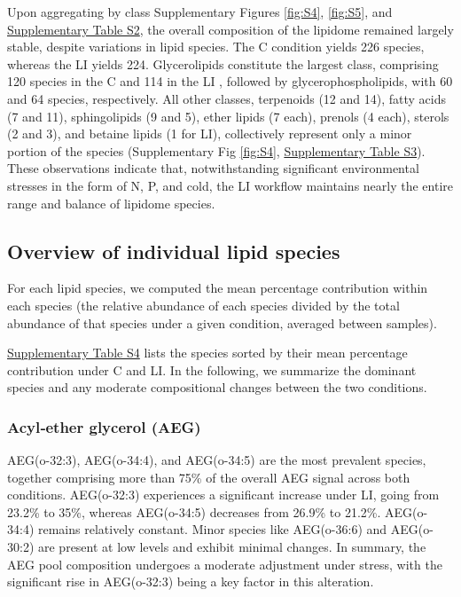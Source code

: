\documentclass[10pt,letterpaper]{article}
\begin{document}
Upon aggregating by class Supplementary Figures \ref{fig:S4}, \ref{fig:S5}, and \href{https://docs.google.com/spreadsheets/d/1SB90-QLYheKEzmHCUIh1UfgkrtbL064s8Oo5BfwFaV0/edit?gid=675277745#gid=675277745}{Supplementary Table S2}, the overall composition of the lipidome remained largely stable, despite variations in lipid species. The C condition yields 226 species, whereas the LI  yields 224. Glycerolipids constitute the largest class, comprising 120 species in the C and 114 in the LI , followed by glycerophospholipids, with 60 and 64 species, respectively. All other classes, terpenoids (12 and 14), fatty acids (7 and 11), sphingolipids (9 and 5), ether lipids (7 each), prenols (4 each), sterols (2 and 3), and betaine lipids (1 for LI), collectively represent only a minor portion of the species (Supplementary Fig \ref{fig:S4}, \href{https://docs.google.com/spreadsheets/d/1SB90-QLYheKEzmHCUIh1UfgkrtbL064s8Oo5BfwFaV0/edit?gid=675277745#gid=675277745}{Supplementary Table S3}). These observations indicate that, notwithstanding significant environmental stresses in the form of N, P, and cold, the LI workflow maintains nearly the entire range and balance of lipidome species.

\subsection*{Overview of individual lipid species}
For each lipid species, we computed the mean percentage contribution within each species (the relative abundance of each species divided by the total abundance of that species under a given condition, averaged between samples). 

\href{https://docs.google.com/spreadsheets/d/1SB90-QLYheKEzmHCUIh1UfgkrtbL064s8Oo5BfwFaV0/edit?gid=675277745#gid=675277745}{Supplementary Table S4} lists the species sorted by their mean percentage contribution under C and LI. In the following, we summarize the dominant species and any moderate compositional changes between the two conditions.

\subsubsection*{Acyl‐ether glycerol (AEG)} 
AEG(o-32:3), AEG(o-34:4), and AEG(o-34:5) are the most prevalent species, together comprising more than 75\% of the overall AEG signal across both conditions. AEG(o-32:3) experiences a significant increase under LI, going from 23.2\% to 35\%, whereas AEG(o-34:5) decreases from 26.9\% to 21.2\%. AEG(o-34:4) remains relatively constant. Minor species like AEG(o-36:6) and AEG(o-30:2) are present at low levels and exhibit minimal changes. In summary, the AEG pool composition undergoes a moderate adjustment under stress, with the significant rise in AEG(o-32:3) being a key factor in this alteration.
\end{document}
